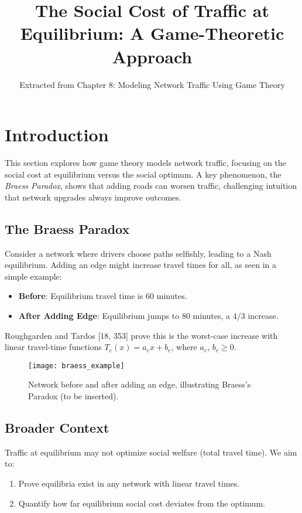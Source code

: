 \documentclass[a4paper,12pt]{article}
\title{The Social Cost of Traffic at Equilibrium: A Game-Theoretic Approach}
\author{Extracted from Chapter 8: Modeling Network Traffic Using Game Theory}
\date{}
\begin{document}
\maketitle

\section{Introduction}
This section explores how game theory models network traffic, focusing on the social cost at equilibrium versus the social optimum. A key phenomenon, the \emph{Braess Paradox}, shows that adding roads can worsen traffic, challenging intuition that network upgrades always improve outcomes.

\subsection{The Braess Paradox}
Consider a network where drivers choose paths selfishly, leading to a Nash equilibrium. Adding an edge might increase travel times for all, as seen in a simple example:
\begin{itemize}
    \item \textbf{Before}: Equilibrium travel time is 60 minutes.
    \item \textbf{After Adding Edge}: Equilibrium jumps to 80 minutes, a \( 4/3 \) increase.
\end{itemize}
Roughgarden and Tardos [18, 353] prove this is the worst-case increase with linear travel-time functions $T_e(x) = a_e x + b_e$, where $a_e$, $b_e\geqslant 0$.

\begin{figure}[h]
    \centering
    \texttt{[image: braess\_example]} %
    \caption{Network before and after adding an edge, illustrating Braess's Paradox (to be inserted).}
    \label{fig:braess}
\end{figure}

\subsection{Broader Context}
Traffic at equilibrium may not optimize social welfare (total travel time). We aim to:
\begin{enumerate}
    \item Prove equilibria exist in any network with linear travel times.
    \item Quantify how far equilibrium social cost deviates from the optimum.
\end{enumerate}
\end{document}

